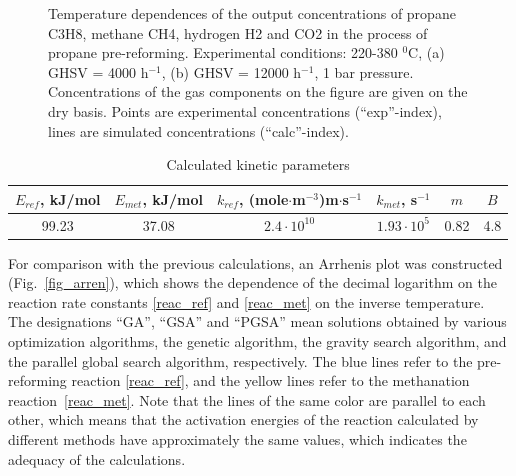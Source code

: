 \documentclass{svproc}
\begin{document}
\begin{figure}[ht]
\begin{minipage}{0.5\linewidth}
	\end{minipage}
	\caption{Temperature dependences of the output concentrations of propane C3H8, methane CH4, hydrogen H2 and CO2 in the process of propane pre-reforming. Experimental conditions: 220-380 $^0$C, (a) GHSV = 4000 h$^{-1}$, (b) GHSV = 12000 h$^{-1}$, 1 bar pressure. Concentrations of the gas components on the figure are given on the dry basis. Points are experimental concentrations (``exp''-index), lines are simulated concentrations (``calc''-index).}
	\label{fig_kin_curves}
\end{figure}


\begin{table}[ht]
	\caption{Calculated kinetic parameters}
	\label{tab:1}
	\center
	\begin{tabular}{c|c|c|c|c|c}
		\hline
		$E_{ref}$, kJ/mol & $E_{met}$, kJ/mol & $k_{ref}$, (mole$\cdot$m$^{-3}$)m$\cdot$s$^{-1}$ & $k_{met}$, s$^{-1}$ & $m$ & $B$ \\
		\hline 
		99.23 \;&	37.08 \; & $2.4 \cdot 10^{10}$ \;  & $1.93 \cdot 10^5$ \; & 0.82 & 4.8  \\
		\hline
	\end{tabular}
\end{table}

For comparison with the previous calculations, an Arrhenis plot was constructed (Fig.~\ref{fig_arren}), which shows the dependence of the decimal logarithm on the reaction rate constants \eqref{reac_ref} and \eqref{reac_met} on the inverse temperature. The designations ``GA'', ``GSA'' and ``PGSA'' mean solutions obtained by various optimization algorithms, the genetic algorithm, the gravity search algorithm, and the parallel global search algorithm, respectively. The blue lines refer to the pre-reforming reaction \eqref{reac_ref}, and the yellow lines refer to the methanation reaction~\eqref{reac_met}. Note that the lines of the same color are parallel to each other, which means that the activation energies of the reaction calculated by different methods have approximately the same values, which indicates the adequacy of the calculations.
\end{document}

